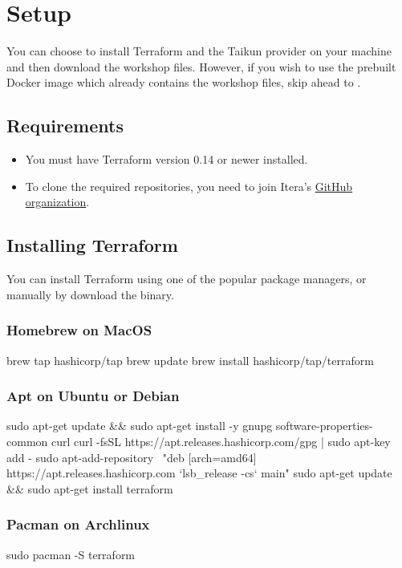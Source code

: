 \section{Setup}

You can choose to install Terraform and the Taikun provider on your machine and
then download the workshop files.
However, if you wish to use the prebuilt Docker image which already contains
the workshop files, skip ahead to .

\subsection{Requirements}
\begin{itemize}
  \item You must have Terraform version 0.14 or newer installed.
  \item To clone the required repositories, you need to join Itera's \href{https://github.com/itera-io}{GitHub organization}.
\end{itemize}

\subsection{Installing Terraform}
You can install Terraform using one of the popular package managers, or manually by
download the binary.
\subsubsection{Homebrew on MacOS}
\begin{shell}
brew tap hashicorp/tap
brew update
brew install hashicorp/tap/terraform
\end{shell}

\subsubsection{Apt on Ubuntu or Debian}
\begin{shell}
sudo apt-get update && sudo apt-get install -y gnupg software-properties-common curl
curl -fsSL https://apt.releases.hashicorp.com/gpg | sudo apt-key add -
sudo apt-add-repository \
"deb [arch=amd64] https://apt.releases.hashicorp.com `lsb_release -cs` main"
sudo apt-get update && sudo apt-get install terraform
\end{shell}

\subsubsection{Pacman on Archlinux}
\begin{shell}
sudo pacman -S terraform
\end{shell}


